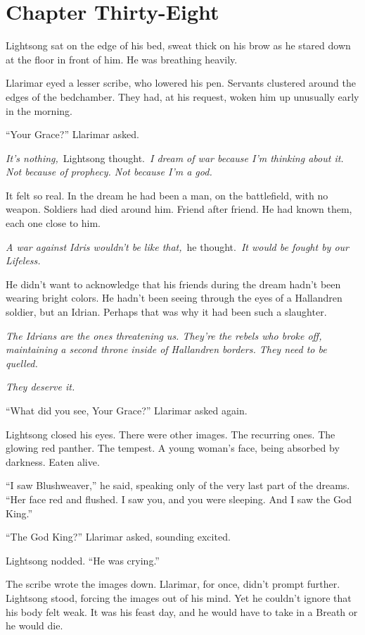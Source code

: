\section{Chapter Thirty-Eight}

Lightsong sat on the edge of his bed, sweat thick on his brow as he stared down at the floor in front of him. He was breathing heavily.

Llarimar eyed a lesser scribe, who lowered his pen. Servants clustered around the edges of the bedchamber. They had, at his request, woken him up unusually early in the morning.

“Your Grace?” Llarimar asked.

\textit{It’s nothing,}~Lightsong thought.~\textit{I dream of war because I’m thinking about it. Not because of prophecy. Not because I’m a god.}

It felt so real. In the dream he had been a man, on the battlefield, with no weapon. Soldiers had died around him. Friend after friend. He had known them, each one close to him.

\textit{A war against Idris wouldn’t be like that,}~he thought.~\textit{It would be fought by our Lifeless.}

He didn’t want to acknowledge that his friends during the dream hadn’t been wearing bright colors. He hadn’t been seeing through the eyes of a Hallandren soldier, but an Idrian. Perhaps that was why it had been such a slaughter.

\textit{The Idrians are the ones threatening us. They’re the rebels who broke off, maintaining a second throne inside of Hallandren borders. They need to be quelled.}

\textit{They deserve it.}

“What did you see, Your Grace?” Llarimar asked again.

Lightsong closed his eyes. There were other images. The recurring ones. The glowing red panther. The tempest. A young woman’s face, being absorbed by darkness. Eaten alive.

“I saw Blushweaver,” he said, speaking only of the very last part of the dreams. “Her face red and flushed. I saw you, and you were sleeping. And I saw the God King.”

“The God King?” Llarimar asked, sounding excited.

Lightsong nodded. “He was crying.”

The scribe wrote the images down. Llarimar, for once, didn’t prompt further. Lightsong stood, forcing the images out of his mind. Yet he couldn’t ignore that his body felt weak. It was his feast day, and he would have to take in a Breath or he would die.

